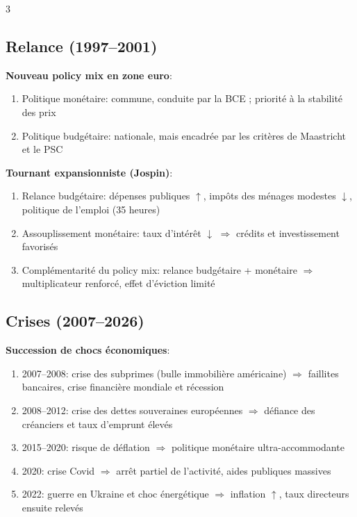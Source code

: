 \documentclass[12pt, a4paper]{article}
\begin{document}
\begin{multicols*}{3}
\colbreak
\subsection{Relance (1997--2001)}

\textbf{Nouveau policy mix en zone euro}:
\begin{enumerate}[\roman*.]
  \item Politique monétaire: commune, conduite par la BCE ; priorité à la stabilité des prix
  \item Politique budgétaire: nationale, mais encadrée par les critères de Maastricht et le PSC
\end{enumerate}

\textbf{Tournant expansionniste (Jospin)}:
\begin{enumerate}[\roman*.]
  \item Relance budgétaire: dépenses publiques $\uparrow$, impôts des ménages modestes $\downarrow$, politique de l'emploi (35 heures)
  \item Assouplissement monétaire: taux d'intérêt $\downarrow$ $\Rightarrow$ crédits et investissement favorisés
  \item Complémentarité du policy mix: relance budgétaire + monétaire $\Rightarrow$ multiplicateur renforcé, effet d'éviction limité
\end{enumerate}

\subsection{Crises (2007--2026)}

\textbf{Succession de chocs économiques}:
\begin{enumerate}[\roman*.]
  \item 2007--2008: crise des subprimes (bulle immobilière américaine) $\Rightarrow$ faillites bancaires, crise financière mondiale et récession
  \item 2008--2012: crise des dettes souveraines européennes $\Rightarrow$ défiance des créanciers et taux d'emprunt élevés
  \item 2015--2020: risque de déflation $\Rightarrow$ politique monétaire ultra-accommodante
  \item 2020: crise Covid $\Rightarrow$ arrêt partiel de l'activité, aides publiques massives
  \item 2022: guerre en Ukraine et choc énergétique $\Rightarrow$ inflation $\uparrow$, taux directeurs ensuite relevés
\end{enumerate}


\end{multicols*}
\end{document}
